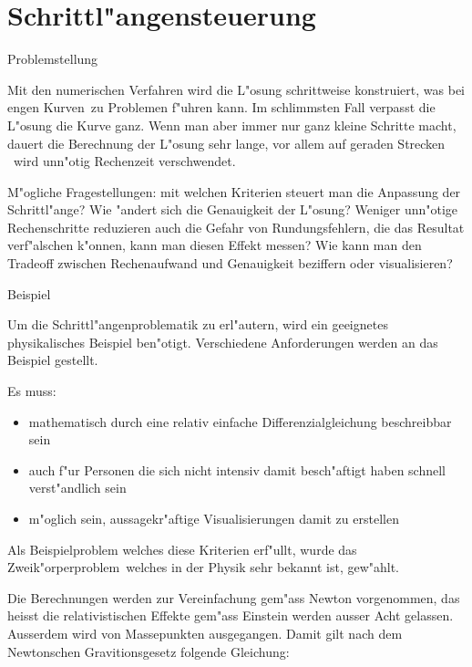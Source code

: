 \chapter{Schrittl"angensteuerung\label{chapter:thema}}
\begin{refsection}
\printbibliography[heading=subbibliography]


Problemstellung

Mit den numerischen Verfahren wird die L"osung schrittweise konstruiert, was bei \glqq engen Kurven\grqq~zu Problemen f"uhren kann.
Im schlimmsten Fall verpasst die L"osung die Kurve ganz.
Wenn man aber immer nur ganz kleine Schritte macht, dauert die Berechnung der L"osung sehr lange, vor allem auf \glqq geraden Strecken \grqq~wird unn"otig Rechenzeit verschwendet.

M"ogliche Fragestellungen: mit welchen Kriterien steuert man die Anpassung der Schrittl"ange?
Wie "andert sich die Genauigkeit der L"osung?
Weniger unn"otige Rechenschritte reduzieren auch die Gefahr von Rundungsfehlern, die das Resultat verf"alschen k"onnen, kann man diesen Effekt messen?
Wie kann man den Tradeoff zwischen Rechenaufwand und Genauigkeit beziffern oder visualisieren?


Beispiel

Um die Schrittl"angenproblematik zu erl"autern, wird ein geeignetes physikalisches Beispiel ben"otigt.
Verschiedene Anforderungen werden an das Beispiel gestellt.

Es muss: 

\begin{itemize}
\item mathematisch durch eine relativ einfache Differenzialgleichung beschreibbar sein
\item auch f"ur Personen die sich nicht intensiv damit besch"aftigt haben schnell verst"andlich sein
\item m"oglich sein, aussagekr"aftige Visualisierungen damit zu erstellen
\end{itemize}

Als Beispielproblem welches diese Kriterien erf"ullt, wurde das \glqq Zweik"orperproblem\grqq~welches in der Physik sehr bekannt ist, gew"ahlt.

Die Berechnungen werden zur Vereinfachung gem"ass Newton vorgenommen, das heisst die relativistischen Effekte gem"ass Einstein werden ausser Acht gelassen.
Ausserdem wird von Massepunkten ausgegangen.
Damit gilt nach dem Newtonschen Gravitionsgesetz folgende Gleichung:


\end{refsection}
